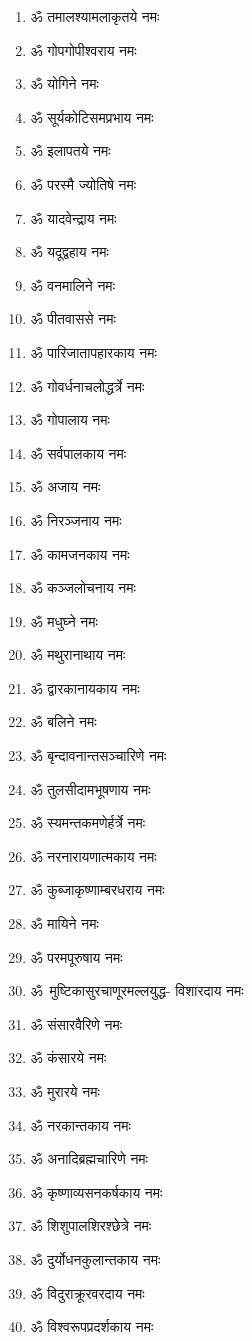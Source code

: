 \begin{multicols}{2}
\begin{enumerate}
\item ॐ तमालश्यामलाकृतये नमः
\item ॐ गोपगोपीश्वराय नमः
\item ॐ योगिने नमः
\item ॐ सूर्यकोटिसमप्रभाय नमः
\item ॐ इलापतये नमः
\item ॐ परस्मै ज्योतिषे नमः
\item ॐ यादवेन्द्राय नमः
\item ॐ यदूद्वहाय नमः
\item ॐ वनमालिने नमः
\item ॐ पीतवाससे नमः
\item ॐ पारिजातापहारकाय नमः
\item ॐ गोवर्धनाचलोद्धर्त्रे नमः
\item ॐ गोपालाय नमः
\item ॐ सर्वपालकाय नमः
\item ॐ अजाय नमः
\item ॐ निरञ्जनाय नमः
\item ॐ कामजनकाय नमः
\item ॐ कञ्जलोचनाय नमः
\item ॐ मधुघ्ने नमः
\item ॐ मथुरानाथाय नमः
\item ॐ द्वारकानायकाय नमः
\item ॐ बलिने नमः
\item ॐ बृन्दावनान्तसञ्चारिणे नमः
\item ॐ तुलसीदामभूषणाय नमः
\item ॐ स्यमन्तकमणेर्हर्त्रे नमः
\item ॐ नरनारायणात्मकाय नमः
\item ॐ कुब्जाकृष्णाम्बरधराय नमः
\item ॐ मायिने नमः
\item ॐ परमपूरुषाय नमः
\item \mbox{ॐ~मुष्टिकासुरचाणूरमल्लयुद्ध-} विशारदाय नमः
\item ॐ संसारवैरिणे नमः
\item ॐ कंसारये नमः
\item ॐ मुरारये नमः
\item ॐ नरकान्तकाय नमः
\item ॐ अनादिब्रह्मचारिणे नमः
\item ॐ कृष्णाव्यसनकर्षकाय नमः
\item ॐ शिशुपालशिरश्छेत्रे नमः
\item ॐ  दुर्योधनकुलान्तकाय नमः
\item ॐ विदुराक्रूरवरदाय नमः
\item ॐ विश्वरूपप्रदर्शकाय नमः

\end{enumerate}
\end{multicols}
